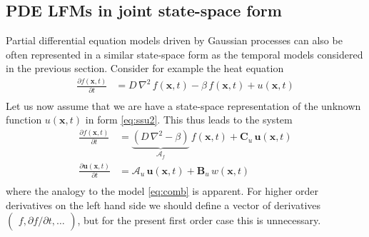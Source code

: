 \documentclass[journal]{IEEEtran}
\begin{document}
\subsection{PDE LFMs in joint state-space form}
%
Partial differential equation models driven by Gaussian processes can also be often represented in a similar state-space form as the temporal models considered in the previous section. Consider for example the heat equation
%
\begin{equation}
\begin{split}
  \frac{\partial f(\mathbf{x},t)}{\partial t} &=
  D \, \nabla^2 \, f(\mathbf{x},t) - \beta \, f(\mathbf{x},t) + u(\mathbf{x},t) \\
\end{split}
\end{equation}
%
Let us now assume that we are have a state-space representation of the unknown function $u(\mathbf{x},t)$ in form \eqref{eq:ssu2}. This thus leads to the system
%
\begin{equation}
\begin{split}
  \frac{\partial f(\mathbf{x},t)}{\partial t} &=
  \underbrace{\left( D \, \nabla^2 - \beta \right)}_{\mathbf{\mathcal{A}}_f} \, f(\mathbf{x},t) + \mathbf{C}_u \, \mathbf{u}(\mathbf{x},t) \\
  \frac{\partial\mathbf{u}(\mathbf{x},t)}{\partial t} &= \mathbf{\mathcal{A}}_u \, \mathbf{u}(\mathbf{x},t)
  + \mathbf{B}_u \, w(\mathbf{x},t) \\
\end{split}
\end{equation}
%
where the analogy to the model \eqref{eq:comb} is apparent. For higher order derivatives on the left hand side we should define a vector of derivatives $\begin{pmatrix} f, \partial f/\partial t, \ldots \end{pmatrix}$, but for the present first order case this is unnecessary.
\end{document}

